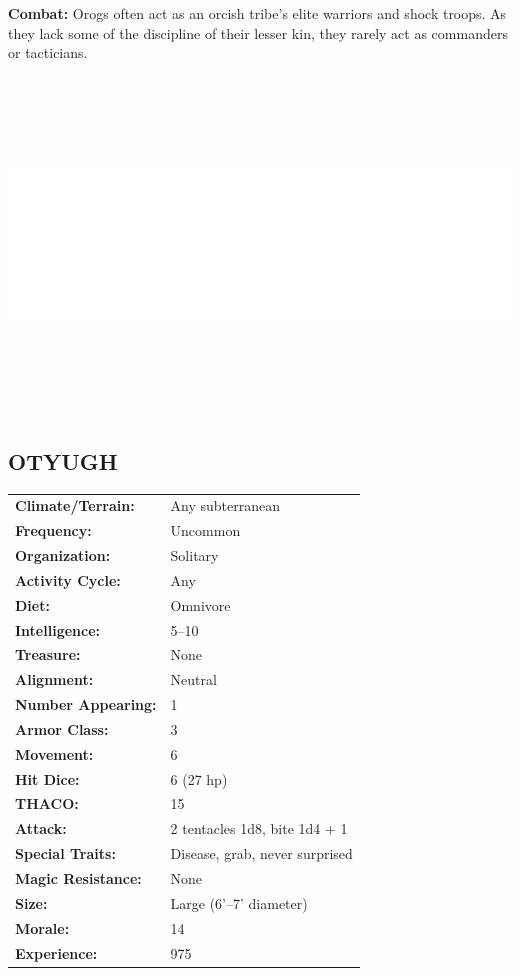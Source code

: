 \begin{multicols}{2}
\textbf{Combat:} Orogs often act as an orcish tribe's elite warriors and shock troops. As they lack some of the discipline of their lesser kin, they rarely act as commanders or tacticians.

\noindent\includegraphics[width=\columnwidth, height=3.5in]{testblock.pdf}

\noindent
\begin{minipage}{\columnwidth}

\vspace{1em}

\subsection{OTYUGH}

\noindent \begin{tabular}{p{}p{}}
\textbf{Climate/Terrain:}	& Any subterranean	\\
\textbf{Frequency:} 		& Uncommon	\\
\textbf{Organization:} 		& Solitary	\\
\textbf{Activity Cycle:} 	& Any	\\
\textbf{Diet:} 				& Omnivore	\\
\textbf{Intelligence:} 		& 5--10	\\
\textbf{Treasure:} 			& None	\\
\textbf{Alignment:} 		& Neutral	\\
\hline
\textbf{Number Appearing:} 	& 1	\\
\textbf{Armor Class:} 		& 3	\\
\textbf{Movement:} 			& 6	\\
\textbf{Hit Dice:} 			& 6	(27 hp)	\\
\textbf{THACO:} 			& 15	\\
\textbf{Attack:} 			& 2 tentacles 1d8, bite 1d4 + 1	\\
\textbf{Special Traits:} & Disease, grab, never surprised	\\
\textbf{Magic Resistance:} 	& None	\\
\textbf{Size:} 				& Large (6'--7' diameter)	\\
\textbf{Morale:} 			& 14	\\
\textbf{Experience:} 		& 975	\\ %
\end{tabular}


\end{minipage}
\end{multicols}

